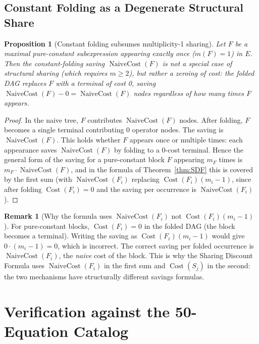 \documentclass[12pt,a4paper]{article}
\newtheorem{proposition}[theorem]{Proposition}
\theoremstyle{definition}
\newtheorem{remark}[theorem]{Remark}
\newcommand{\Cost}{\operatorname{Cost}}
\newcommand{\NC}{\operatorname{NaiveCost}}
\begin{document}
\subsection{Constant Folding as a Degenerate Structural Share}

\begin{proposition}[Constant folding subsumes multiplicity-1 sharing]
\label{prop:fold-special}
Let $F$ be a maximal pure-constant subexpression appearing exactly once
($m(F) = 1$) in $E$.  Then the constant-folding saving $\NC(F)$ is not
a special case of structural sharing (which requires $m \geq 2$), but
rather a zeroing of cost: the folded DAG replaces $F$ with a terminal of
cost 0, saving $\NC(F) - 0 = \NC(F)$ nodes regardless of how many times
$F$ appears.
\end{proposition}

\begin{proof}
In the naive tree, $F$ contributes $\NC(F)$ nodes.  After folding, $F$
becomes a single terminal contributing 0 operator nodes.  The saving is
$\NC(F)$.  This holds whether $F$ appears once or multiple times: each
appearance saves $\NC(F)$ by folding to a 0-cost terminal.  Hence the
general form of the saving for a pure-constant block $F$ appearing $m_F$
times is $m_F \cdot \NC(F)$, and in the formula of
Theorem~\ref{thm:SDF} this is covered by the first sum (with
$\NC(F_i)$ replacing $\Cost(F_i)(m_i-1)$, since after folding
$\Cost(F_i) = 0$ and the saving per occurrence is $\NC(F_i)$).
\end{proof}

\begin{remark}[Why the formula uses $\NC(F_i)$ not $\Cost(F_i)(m_i - 1)$]
For pure-constant blocks, $\Cost(F_i) = 0$ in the folded DAG (the block
becomes a terminal).  Writing the saving as $\Cost(F_i)(m_i - 1)$ would
give $0 \cdot (m_i - 1) = 0$, which is incorrect.  The correct saving per
folded occurrence is $\NC(F_i)$, the \emph{naive} cost of the block.  This
is why the Sharing Discount Formula uses $\NC(F_i)$ in the first sum and
$\Cost(S_j)$ in the second: the two mechanisms have structurally different
savings formulas.
\end{remark}

\section{Verification against the 50-Equation Catalog}
\label{sec:verify}
\end{document}
